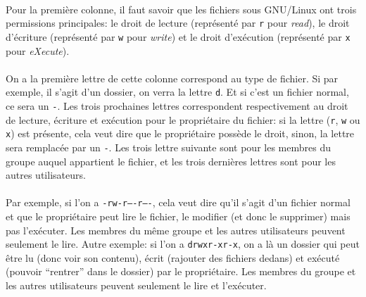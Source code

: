 \paragraph{} Pour la première colonne, il faut savoir que les fichiers sous
GNU/Linux ont trois permissions principales: le droit de lecture (représenté
par \texttt{r} pour \emph{read}), le droit d'écriture (représenté par
\texttt{w} pour \emph{write}) et le droit d'exécution (représenté par
\texttt{x} pour \emph{eXecute}).

\paragraph{} On a la première lettre de cette colonne correspond au type de
fichier. Si par exemple, il s'agit d'un dossier, on verra la lettre \texttt{d}.
Et si c'est un fichier normal, ce sera un \texttt{-}. Les trois prochaines
lettres correspondent respectivement au droit de lecture, écriture et exécution
pour le propriétaire du fichier: si la lettre (\texttt{r}, \texttt{w} ou
\texttt{x}) est présente, cela veut dire que le propriétaire possède le droit,
sinon, la lettre sera remplacée par un \texttt{-}. Les trois lettre suivante
sont pour les membres du groupe auquel appartient le fichier, et les trois
dernières lettres sont pour les autres utilisateurs.

\paragraph{} Par exemple, si l'on a \texttt{-rw-r----r----}, cela veut dire
qu'il s'agit d'un fichier normal et que le propriétaire peut lire le fichier,
le modifier (et donc le supprimer) mais pas l'exécuter. Les membres du même
groupe et les autres utilisateurs peuvent seulement le lire. Autre exemple: si
l'on a \texttt{drwxr-xr-x}, on a là un dossier qui peut être lu (donc voir son
contenu), écrit (rajouter des fichiers dedans) et exécuté (pouvoir ``rentrer''
dans le dossier) par le propriétaire. Les membres du groupe et les autres
utilisateurs peuvent seulement le lire et l'exécuter.
